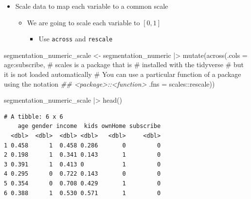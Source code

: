 \documentclass[
  ignorenonframetext,
]{beamer}
\newenvironment{Shaded}{\begin{snugshade}}{\end{snugshade}}
\newcommand{\AttributeTok}[1]{\textcolor[rgb]{0.40,0.45,0.13}{#1}}
\newcommand{\CommentTok}[1]{\textcolor[rgb]{0.37,0.37,0.37}{#1}}
\newcommand{\DocumentationTok}[1]{\textcolor[rgb]{0.37,0.37,0.37}{\textit{#1}}}
\newcommand{\FunctionTok}[1]{\textcolor[rgb]{0.28,0.35,0.67}{#1}}
\newcommand{\NormalTok}[1]{\textcolor[rgb]{0.00,0.23,0.31}{#1}}
\newcommand{\OtherTok}[1]{\textcolor[rgb]{0.00,0.23,0.31}{#1}}
\newcommand{\SpecialCharTok}[1]{\textcolor[rgb]{0.37,0.37,0.37}{#1}}
\providecommand{\tightlist}{%
  \setlength{\itemsep}{0pt}\setlength{\parskip}{0pt}}\usepackage{longtable,booktabs,array}
\begin{document}
\begin{frame}[fragile]{}
\label{section-47}
\begin{itemize}
\item
  Scale data to map each variable to a common scale

  \begin{itemize}
  \item
    We are going to scale each variable to \([0,1]\)

    \begin{itemize}
    \tightlist
    \item
      Use \texttt{across} and \texttt{rescale}
    \end{itemize}
  \end{itemize}
\end{itemize}

\tiny

\begin{Shaded}
\begin{Highlighting}[]
\NormalTok{segmentation\_numeric\_scale }\OtherTok{\textless{}{-}}\NormalTok{ segmentation\_numeric }\SpecialCharTok{|\textgreater{}} 
  \FunctionTok{mutate}\NormalTok{(}\FunctionTok{across}\NormalTok{(}\AttributeTok{.cols =}\NormalTok{ age}\SpecialCharTok{:}\NormalTok{subscribe,}
                \CommentTok{\# scales is a package that is }
                \CommentTok{\# installed with the tidyverse}
                \CommentTok{\# but it is not loaded automatically}
                \CommentTok{\# You can use a particular function of a package using the notation}
                \DocumentationTok{\#\# \textless{}package\textgreater{}::\textless{}function\textgreater{}}
                \AttributeTok{.fns =}\NormalTok{ scales}\SpecialCharTok{::}\NormalTok{rescale))}

\NormalTok{segmentation\_numeric\_scale }\SpecialCharTok{|\textgreater{}} \FunctionTok{head}\NormalTok{()}
\end{Highlighting}
\end{Shaded}

\begin{verbatim}
# A tibble: 6 x 6
    age gender income  kids ownHome subscribe
  <dbl>  <dbl>  <dbl> <dbl>   <dbl>     <dbl>
1 0.458      1  0.458 0.286       0         0
2 0.198      1  0.341 0.143       1         0
3 0.391      1  0.413 0           1         0
4 0.295      0  0.722 0.143       0         0
5 0.354      0  0.708 0.429       1         0
6 0.388      1  0.530 0.571       1         0
\end{verbatim}
\end{frame}
\end{document}
